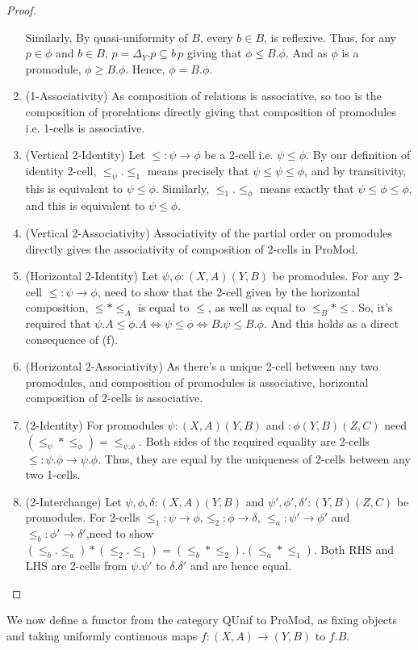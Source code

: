 \documentclass[18pt,a4paper]{article}
\makeatletter
\theoremstyle{definition}
\newcommand{\carrow}{}%
\DeclareRobustCommand{\carrow}{%
	\mathrel{\vphantom{\rightarrow}\mathpalette\circle@arrow\relax}%
}
\newcommand{\circle@arrow}[2]{%
	\m@th
	\ooalign{%
		\hidewidth$#1\circ\mkern1mu$\hidewidth\cr
	$#1\longrightarrow$\cr}%
}
\makeatother
\begin{document}
\begin{proof}
\begin{enumerate}[label=(\alph*)]
					Similarly, By quasi-uniformity of $B$, every $b \in B$, is
					reflexive. Thus, for any $p \in \phi$ and $b\in B$, $p=\Delta_Y.p\subseteq
					b\,p$ giving that $\phi \leq B.\phi$. And as $\phi$ is a promodule,
					$\phi \geq B.\phi$. Hence, $\phi=B.\phi$.
				\item (1-Associativity) As composition of relations is associative, so too is the
					composition of prorelations directly giving that composition of promodules
					i.e. 1-cells is associative.
				\item (Vertical 2-Identity) Let $\leq:\psi \to \phi$ be a 2-cell i.e.
					$\psi \leq \phi$. By our definition of identity 2-cell, $\leq_\psi.\leq_1$
					means precisely that $\psi \leq \psi \leq \phi $, and by transitivity,
					this is equivalent to $\psi \leq \phi$.
					Similarly, $\leq_1.\leq_\phi$ means exactly that $\psi
					\leq \phi \leq \phi $, and this is equivalent to $\psi \leq \phi$.
				\item (Vertical 2-Associativity) Associativity of the partial order on promodules
					directly gives the associativity of composition of 2-cells in ProMod.
				\item (Horizontal 2-Identity) Let $\psi,\phi: (X,A)\carrow (Y,B)$ be promodules.
					For any 2-cell $\leq:\psi \to \phi $, need to show that the 2-cell given
					by the horizontal composition, $\leq*\leq_A$ is equal to $\leq$, as well as
					equal to $\leq_B *\leq$. So, it's required that $\psi.A \leq \phi.A
					\iff \psi \leq \phi \iff B.\psi \leq B.\phi$. And this holds as a
					direct consequence of (f).
				\item (Horizontal 2-Associativity) As there's a unique 2-cell between any two
					promodules, and composition of promodules is associative,
					horizontal composition of 2-cells is associative.
				\item (2-Identity) For promodules $\psi:(X,A)\carrow (Y,B)$ and
					$:\phi(Y,B) \carrow (Z,C)$ need $(\leq_\psi * \leq_\phi)=\leq_{\psi.\phi}$.
					Both sides of the required equality are 2-cells $\leq:\psi.\phi
					\to \psi.\phi$.	Thus, they are equal by the uniqueness of 2-cells between
					any two 1-cells.
				\item (2-Interchange) Let $\psi,\phi,\delta:(X,A) \carrow (Y,B)$ and
					$\psi',\phi',\delta':(Y,B) \carrow (Z,C)$ be promodules. For
					2-cells $\leq_1:\psi \to \phi $,$\leq_2:\phi \to \delta $,
					$\leq_a:\psi' \to \phi' $ and $\leq_b:\phi' \to \delta'$,need to show
					$(\leq_b.\leq_a)*(\leq_2.\leq_1)=(\leq_b*\leq_2).(\leq_a*\leq_1)$.
					Both RHS and LHS are 2-cells from $\psi.\psi'$ to $\delta.\delta'$ and are
					hence equal. \qedhere
			\end{enumerate}
		\end{proof}
		We now define a functor from the category QUnif to ProMod, as fixing objects and taking uniformly
		continuous maps $f:(X,A)\to(Y,B)$ to $f.B$.
\end{document}
